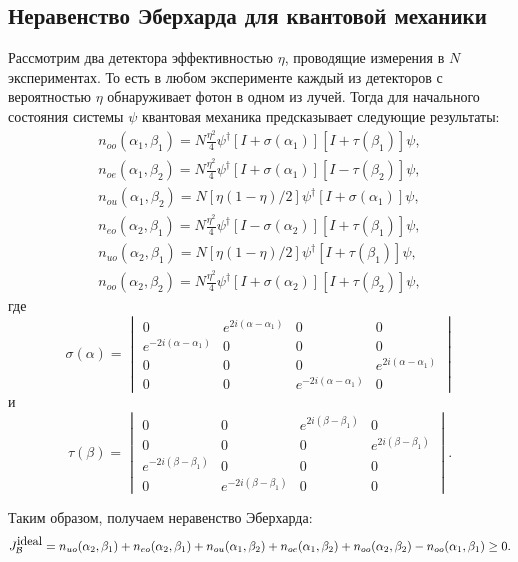 \documentclass[%
master,         %
subf,           %
href,           %
colorlinks=true %
]{disser}
\numberwithin{equation}{section}
\numberwithin{figure}{section}
\begin{document}
\subsection{Неравенство Эберхарда для квантовой механики}
Рассмотрим два детектора эффективностью $\eta$, проводящие измерения в $N$ экспериментах. То есть в любом эксперименте каждый из детекторов с вероятностью $\eta$ обнаруживает фотон в одном из лучей. Тогда для начального состояния системы $\psi$ квантовая механика предсказывает следующие результаты:
\begin{eqnarray} \label{eq:Eberhard_n_start}
n_{oo}(\alpha_1, \beta_1) = N\frac{\eta^2}{4}\psi^\dagger[I + \sigma(\alpha_1)][I + \tau(\beta_1)]\psi,\\
n_{oe}(\alpha_1, \beta_2) = N\frac{\eta^2}{4}\psi^\dagger[I + \sigma(\alpha_1)][I - \tau(\beta_2)]\psi,\\
n_{ou}(\alpha_1, \beta_2) = N[\eta(1 - \eta)/2]\psi^\dagger[I + \sigma(\alpha_1)]\psi,\\ \label{eq:Eberhard_n_ou}
n_{eo}(\alpha_2, \beta_1) = N\frac{\eta^2}{4}\psi^\dagger[I - \sigma(\alpha_2)][I + \tau(\beta_1)]\psi,\\
n_{uo}(\alpha_2, \beta_1) = N[\eta(1 - \eta)/2]\psi^\dagger[I + \tau(\beta_1)]\psi,\\ \label{eq:Eberhard_n_uo}
n_{oo}(\alpha_2, \beta_2) = N\frac{\eta^2}{4}\psi^\dagger[I + \sigma(\alpha_2)][I + \tau(\beta_2)]\psi, \label{eq:Eberhard_n_finish}
\end{eqnarray}
где 
\[
\sigma(\alpha) = 
\begin{vmatrix}
0 & e^{2i(\alpha - \alpha_1)} & 0 & 0\\
e^{-2i(\alpha - \alpha_1)} & 0 & 0 & 0\\
0 & 0 & 0 & e^{2i(\alpha - \alpha_1)}\\
0 & 0 & e^{-2i(\alpha - \alpha_1)} & 0
\end{vmatrix}
\] 
и 
\[
\tau(\beta) = 
\begin{vmatrix}
0 & 0 & e^{2i(\beta - \beta_1)} & 0\\
0 & 0 & 0 & e^{2i(\beta - \beta_1)}\\
e^{-2i(\beta - \beta_1)} & 0 & 0 & 0\\
0 & e^{-2i(\beta - \beta_1)} & 0 & 0
\end{vmatrix}.
\]

Таким образом, получаем неравенство Эберхарда:
\[
J_{\mathcal{B}}^{\mbox{ideal}} = n_{uo}(\alpha_2, \beta_1) + n_{eo}(\alpha_2, \beta_1) + n_{ou}(\alpha_1, \beta_2) \\
+ n_{oe}(\alpha_1, \beta_2) + n_{oo}(\alpha_2, \beta_2) - n_{oo}(\alpha_1, \beta_1) \geq 0.
\]
\end{document}
